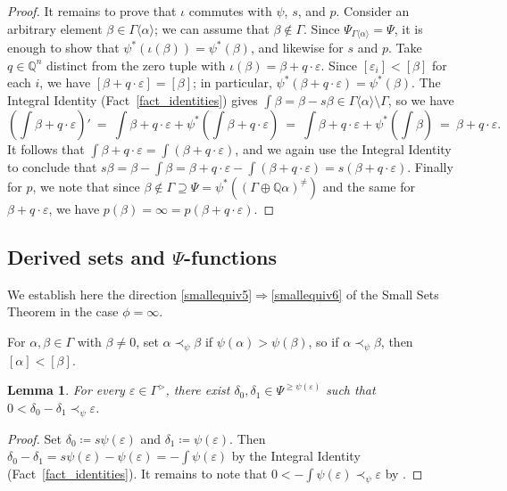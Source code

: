 \documentclass[11pt]{amsart}
\theoremstyle{plain}
\newtheorem{lemma}[thm]{Lemma}
\theoremstyle{definition}
\numberwithin{equation}{section}
\newcommand\Q{\mathbb{Q}}
\newcommand\0{\varnothing}
\begin{document}
\begin{proof}
It remains to prove that $\iota$ commutes with $\psi$, $s$, and $p$. Consider an arbitrary element $\beta \in \Gamma\langle \alpha\rangle$; we can assume that $\beta \not\in \Gamma$. Since $\Psi_{\Gamma\langle\alpha\rangle} = \Psi$, it is enough to show that $\psi^*(\iota(\beta)) = \psi^*(\beta)$, and likewise for $s$ and $p$. 
Take $q \in \Q^n$ distinct from the zero tuple with $\iota(\beta) = \beta + q\cdot \varepsilon$.  Since $[\varepsilon_i]<[\beta]$ for each $i$, we have $[\beta + q\cdot\varepsilon] = [\beta]$; in particular, $\psi^*(\beta+q\cdot\varepsilon) = \psi^*(\beta)$. The Integral Identity (Fact~\ref{fact_identities}) gives $\textstyle{\int}\beta = \beta - s\beta \in \Gamma\langle \alpha\rangle\setminus \Gamma$, so we have
\[
(\textstyle{\int} \beta+q\cdot\varepsilon)'\ =\ \textstyle{\int} \beta+q\cdot\varepsilon+\psi^*(\textstyle{\int} \beta+q\cdot\varepsilon)\ =\ \textstyle{\int} \beta+q\cdot\varepsilon+\psi^*(\textstyle{\int} \beta)\ =\ \beta+q\cdot\varepsilon.
\]
It follows that $\textstyle{\int} \beta+q\cdot\varepsilon = \textstyle{\int}( \beta+q\cdot\varepsilon)$, and we again use the Integral Identity to conclude that $s\beta = \beta - \textstyle{\int}\beta = \beta +q\cdot\varepsilon -  \textstyle{\int}( \beta+q\cdot\varepsilon) = s(\beta+q\cdot\varepsilon)$. Finally for $p$, we note that since $\beta \not\in \Gamma  \supseteq \Psi = \psi^*((\Gamma\oplus\Q\alpha)^{\neq})$ and the same for $\beta+q\cdot\varepsilon$, we have $p(\beta)=\infty=p(\beta+q\cdot\varepsilon)$.
\end{proof}



\subsection{Derived sets and \texorpdfstring{$\Psi$}{Ψ}-functions} \label{Psi_functions_CB_subsection}
We establish here the direction \eqref{smallequiv5}$\Rightarrow$\eqref{smallequiv6} of the Small Sets Theorem in the case $\phi=\infty$.

\medskip\noindent
For $\alpha,\beta\in\Gamma$ with $\beta\neq 0$, set $\alpha \prec_{\psi} \beta$ if $\psi(\alpha)>\psi(\beta)$, so if $\alpha\prec_{\psi}\beta$, then $[\alpha]<[\beta]$. 
\begin{lemma}\label{lem_arbsmalldiff}
For every $\varepsilon \in \Gamma^>$, there exist $\delta_0,\delta_1\in \Psi^{\geq\psi(\varepsilon)}$ such that $0<\delta_0-\delta_1 \prec_{\psi} \varepsilon$.
\end{lemma}
\begin{proof}
Set $\delta_0\coloneqq s\psi(\varepsilon)$ and $\delta_1\coloneqq\psi(\varepsilon)$.
Then $\delta_0-\delta_1 = s\psi(\varepsilon)-\psi(\varepsilon) = -\textstyle{\int}\psi(\varepsilon)$
by the Integral Identity (Fact~\ref{fact_identities}).
It remains to note that $0<-\textstyle{\int}\psi(\varepsilon) \prec_{\psi} \varepsilon$ by \cite[Lemma~9.2.18(iii)]{ADAMTT}.
\end{proof}
\end{document}
